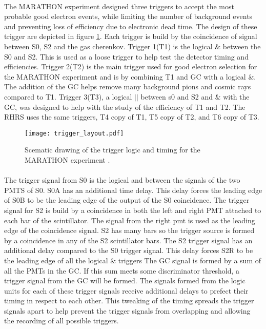 \paragraph{} The MARATHON experiment designed three triggers to accept the most probable good electron events, while limiting the number of background events and preventing loss of efficiency due to electronic dead time. The design of these trigger are depicted in figure \ref{fig:trig_layout}. Each trigger is build by the coincidence of signal between S0, S2 and the gas cherenkov.  Trigger 1(T1) is the logical $\&$ between the S0 and S2. This is used as a loose trigger to help test the detector timing and efficiencies.  Trigger 2(T2) is the main trigger used for good electron selection for the MARATHON experiment and is by  combining T1 and GC with a logical $\&$. The addition of the GC helps remove many background pions and cosmic rays compared to T1. Trigger 3(T3), a logical $||$ between s0 and S2 and $\&$ with the GC, was designed to help with the study of the efficiency of T1 and T2. The RHRS uses the same triggers, T4 copy of T1, T5 copy of T2, and T6 copy of T3.
\begin{figure}[t]
	\texttt{[image: trigger\_layout.pdf]}
	\caption{Scematic drawing of the trigger logic and timing for the MARATHON experiment \cite{flo_trig}.}
	\label{fig:trig_layout}
\end{figure}
\paragraph{}The trigger signal from  S0 is the logical and between the signals of the two PMTS of S0. S0A has an additional time delay. This delay forces the leading edge of S0B to be the leading edge of the output of the S0 coincidence. The trigger signal for S2 is build by a coincidence in both the left and right PMT attached to each bar of the scintillator. The signal from the right pmt is used as the leading edge of the coincidence signal. S2 has many bars so the trigger source is formed by a coincidence in any of the S2 scintillator bars. The S2 trigger signal has an additional delay compared to the S0 trigger signal. This delay forces S2R to be the leading edge of all the logical $\&$ triggers The GC signal is formed by a sum of all the PMTs in the GC. If this sum meets some discriminator threshold, a trigger signal from the GC will be formed. The signals formed from the logic units for each of these trigger signals receive additional delays to prefect their timing in respect to each other. This tweaking of the timing spreads the trigger signals apart to help prevent the trigger signals from overlapping and allowing the recording of all possible triggers. 
 
